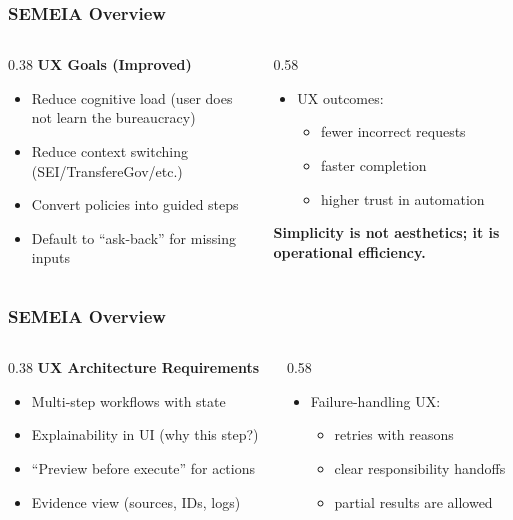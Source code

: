 \documentclass[aspectratio=169]{beamer}
\newcommand{\focusline}[1]{%
  \vspace{0.25em}%
  {\color{accentorange}\footnotesize\bfseries #1}%
}
\newcommand{\insertframeref}{}
\newcommand{\frameref}[1]{\gdef\insertframeref{#1}}
\newcommand{\twocolslide}[5]{%
  \begin{frame}
    \frametitle{#2}%
    \frameref{#1}%
    \begin{columns}[c,onlytextwidth]
      \begin{column}{0.38\textwidth}
        \textbf{#3}
        \vspace{0.3em}
        #4
      \end{column}
      \begin{column}{0.58\textwidth}
        #5
      \end{column}
    \end{columns}
  \end{frame}
}
\begin{document}
\twocolslide
  {}
  {SEMEIA Overview}
  {UX Goals (Improved)}
  {
    \begin{itemize}
      \item Reduce cognitive load (user does not learn the bureaucracy)
      \item Reduce context switching (SEI/TransfereGov/etc.)
      \item Convert policies into guided steps
      \item Default to ``ask-back'' for missing inputs
    \end{itemize}
  }
  {
    \begin{itemize}
      \item UX outcomes:
        \begin{itemize}
          \item fewer incorrect requests
          \item faster completion
          \item higher trust in automation
        \end{itemize}
    \end{itemize}
    \vspace{0.3em}
    \focusline{Simplicity is not aesthetics; it is operational efficiency.}
  }

\twocolslide
  {}
  {SEMEIA Overview}
  {UX Architecture Requirements}
  {
    \begin{itemize}
      \item Multi-step workflows with state
      \item Explainability in UI (why this step?)
      \item ``Preview before execute'' for actions
      \item Evidence view (sources, IDs, logs)
    \end{itemize}
  }
  {
    \begin{itemize}
      \item Failure-handling UX:
        \begin{itemize}
          \item retries with reasons
          \item clear responsibility handoffs
          \item partial results are allowed
        \end{itemize}
    \end{itemize}
  }
\end{document}
